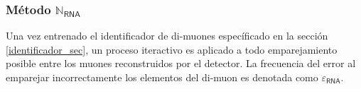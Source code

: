 

\subsubsection{Método $\mathbb{N}_\textsf{RNA}$}
Una vez entrenado el identificador de di-muones específicado en la sección \ref{identificador_sec}, un proceso iteractivo es aplicado a todo emparejamiento posible entre los muones reconstruidos por el detector. La frecuencia del error al emparejar incorrectamente los elementos del di-muon es denotada como $\varepsilon_\textsf{RNA}$.

